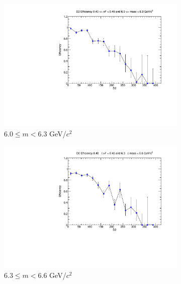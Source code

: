 \documentclass[11pt]{article}
\begin{document}
\begin{figure}[p]
\begin{subfigure}[b]{0.32\textwidth}
        \includegraphics[width=\textwidth]{./kTrackerEfficiencyPlots/D2_Efficiency_xF8_mass6.pdf}
        \caption{$6.0 \leq m < 6.3$ GeV/$c^2$}
    \end{subfigure}\hfill
    \begin{subfigure}[b]{0.32\textwidth}
        \centering
        \includegraphics[width=\textwidth]{./kTrackerEfficiencyPlots/D2_Efficiency_xF8_mass7.pdf}
        \caption{$6.3 \leq m < 6.6$ GeV/$c^2$}
    \end{subfigure}\hfill
    \begin{subfigure}[b]{0.32\textwidth}
        \centering

\end{subfigure}
\end{figure}
\end{document}
